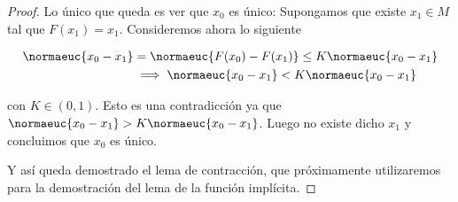 \begin{proof}
    Lo único que queda es ver que $x_0$ es único: Supongamos que existe $x_1 \in M$ tal que $F(x_1) = x_1$. Consideremos ahora lo siguiente
    
    \begin{align*}
        \normaeuc{x_0 - x_1} &= \normaeuc{F(x_0) - F(x_1)} \leq K\normaeuc{x_0 - x_1} \\
        &\implies \normaeuc{x_0 - x_1} < K\normaeuc{x_0 - x_1}
    \end{align*}
    
    \noindent con $K \in (0,1)$. Esto es una contradicción ya que $\normaeuc{x_0 - x_1} > K\normaeuc{x_0 - x_1}$. Luego no existe dicho $x_1$ y concluimos que $x_0$ es único.
    
    Y así queda demostrado el lema de contracción, que próximamente utilizaremos para la demostración del lema de la función implícita.
\end{proof}